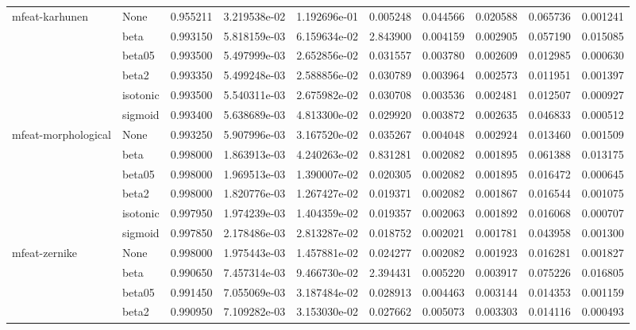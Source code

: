 \begin{tabular}{llrrrrrrrr}
mfeat-karhunen & None &  0.955211 &  3.219538e-02 &  1.192696e-01 &   0.005248 &  0.044566 &  0.020588 &  0.065736 &  0.001241 \\
        & beta &  0.993150 &  5.818159e-03 &  6.159634e-02 &   2.843900 &  0.004159 &  0.002905 &  0.057190 &  0.015085 \\
        & beta05 &  0.993500 &  5.497999e-03 &  2.652856e-02 &   0.031557 &  0.003780 &  0.002609 &  0.012985 &  0.000630 \\
        & beta2 &  0.993350 &  5.499248e-03 &  2.588856e-02 &   0.030789 &  0.003964 &  0.002573 &  0.011951 &  0.001397 \\
        & isotonic &  0.993500 &  5.540311e-03 &  2.675982e-02 &   0.030708 &  0.003536 &  0.002481 &  0.012507 &  0.000927 \\
        & sigmoid &  0.993400 &  5.638689e-03 &  4.813300e-02 &   0.029920 &  0.003872 &  0.002635 &  0.046833 &  0.000512 \\
mfeat-morphological & None &  0.993250 &  5.907996e-03 &  3.167520e-02 &   0.035267 &  0.004048 &  0.002924 &  0.013460 &  0.001509 \\
        & beta &  0.998000 &  1.863913e-03 &  4.240263e-02 &   0.831281 &  0.002082 &  0.001895 &  0.061388 &  0.013175 \\
        & beta05 &  0.998000 &  1.969513e-03 &  1.390007e-02 &   0.020305 &  0.002082 &  0.001895 &  0.016472 &  0.000645 \\
        & beta2 &  0.998000 &  1.820776e-03 &  1.267427e-02 &   0.019371 &  0.002082 &  0.001867 &  0.016544 &  0.001075 \\
        & isotonic &  0.997950 &  1.974239e-03 &  1.404359e-02 &   0.019357 &  0.002063 &  0.001892 &  0.016068 &  0.000707 \\
        & sigmoid &  0.997850 &  2.178486e-03 &  2.813287e-02 &   0.018752 &  0.002021 &  0.001781 &  0.043958 &  0.001300 \\
mfeat-zernike & None &  0.998000 &  1.975443e-03 &  1.457881e-02 &   0.024277 &  0.002082 &  0.001923 &  0.016281 &  0.001827 \\
        & beta &  0.990650 &  7.457314e-03 &  9.466730e-02 &   2.394431 &  0.005220 &  0.003917 &  0.075226 &  0.016805 \\
        & beta05 &  0.991450 &  7.055069e-03 &  3.187484e-02 &   0.028913 &  0.004463 &  0.003144 &  0.014353 &  0.001159 \\
        & beta2 &  0.990950 &  7.109282e-03 &  3.153030e-02 &   0.027662 &  0.005073 &  0.003303 &  0.014116 &  0.000493 \\

\end{tabular}
